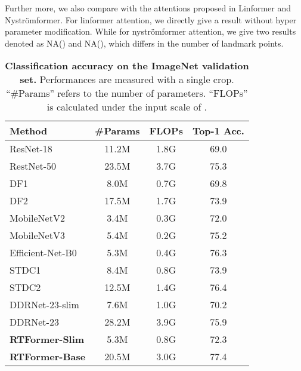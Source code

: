 \documentclass{article}
\begin{document}
Further more, we also compare with the attentions proposed in Linformer \cite{wang2020linformer} and Nystr{\"o}mformer\cite{xiong2021nystromformer}. For linformer attention, we directly give a result without hyper parameter modification. While for nystr{\"o}mformer attention, we give two results denoted as NA() and NA(), which differs in the number of landmark points.

\begin{table}[t]
\centering
\caption{\textbf{Classification accuracy on the ImageNet validation set.} Performances are measured with a single  crop. ``\#Params'' refers to the number of parameters. ``FLOPs'' is calculated under the input scale of .}
\begin{tabular}{l|c|c|c}
\toprule
Method & \#Params & FLOPs & Top-1 Acc. \\
\midrule
ResNet-18\cite{he2016deep} & 11.2M & 1.8G & 69.0 \\
RestNet-50\cite{he2016deep} & 23.5M & 3.7G & 75.3 \\
DF1\cite{li2019partial} & 8.0M & 0.7G & 69.8 \\
DF2\cite{li2019partial} & 17.5M & 1.7G & 73.9 \\
MobileNetV2\cite{sandler2018mobilenetv2} & 3.4M & 0.3G & 72.0 \\
MobileNetV3\cite{howard2019searching} & 5.4M & 0.2G & 75.2 \\
Efficient-Net-B0\cite{tan2019efficientnet} & 5.3M & 0.4G & 76.3 \\
STDC1\cite{fan2021rethinking} & 8.4M & 0.8G & 73.9 \\
STDC2\cite{fan2021rethinking} & 12.5M & 1.4G & 76.4 \\
\midrule
DDRNet-23-slim\cite{hong2021deep} & 7.6M & 1.0G & 70.2 \\
DDRNet-23\cite{hong2021deep} & 28.2M & 3.9G & 75.9 \\
\midrule
\textbf{RTFormer-Slim} & 5.3M & 0.8G & 72.3 \\
\textbf{RTFormer-Base} & 20.5M & 3.0G & 77.4 \\
\bottomrule
\end{tabular}
\label{supp-tab:imagenet-result}
\end{table}
\end{document}
